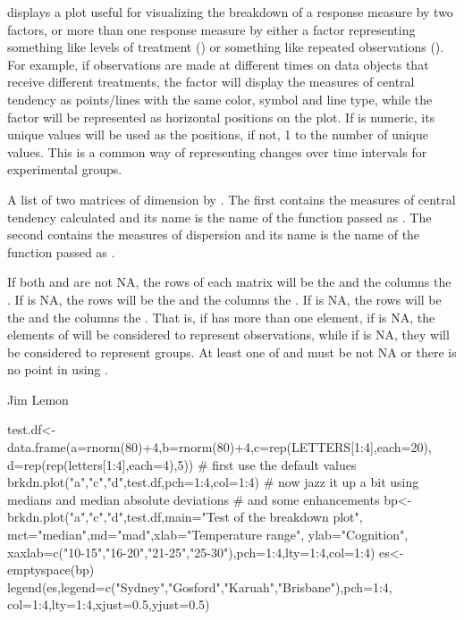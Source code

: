 \begin{Details}\relax
{} displays a plot useful for visualizing the breakdown of a
response measure by two factors, or more than one response measure by either
a factor representing something like levels of treatment () or
something like repeated observations (). For example, if
observations are made at different times on data objects that receive
different treatments, the  factor will display the measures
of central tendency as points/lines with the same color, symbol and line type,
while the  factor will be represented as horizontal positions on the
plot. If  is numeric, its unique values will be used as the 
positions, if not, 1 to the number of unique values. This is a common way of 
representing changes over time intervals for experimental groups.
\end{Details}
\begin{Value}
A list of two matrices of dimension  by 
. The first contains the measures of central
tendency calculated and its name is the name of the function passed as
. The second contains the measures of dispersion and its name
is the name of the function passed as .

If both  and  are not NA, the rows of each matrix
will be the  and the columns the . If 
is NA, the rows will be the  and the columns the .
If  is NA, the rows will be the  and the columns
the . That is, if  has more than one element, if
 is NA, the elements of  will be considered to
represent observations, while if  is NA, they will be
considered to represent groups. At least one of  and 
must be not NA or there is no point in using .
\end{Value}
\begin{Author}\relax
Jim Lemon
\end{Author}
\begin{SeeAlso}\relax
{}
\end{SeeAlso}
\begin{Examples}
\begin{ExampleCode}
 test.df<-data.frame(a=rnorm(80)+4,b=rnorm(80)+4,c=rep(LETTERS[1:4],each=20),
  d=rep(rep(letters[1:4],each=4),5))
 # first use the default values
 brkdn.plot("a","c","d",test.df,pch=1:4,col=1:4)
 # now jazz it up a bit using medians and median absolute deviations
 # and some enhancements
 bp<-brkdn.plot("a","c","d",test.df,main="Test of the breakdown plot",
  mct="median",md="mad",xlab="Temperature range", ylab="Cognition",
  xaxlab=c("10-15","16-20","21-25","25-30"),pch=1:4,lty=1:4,col=1:4)
 es<-emptyspace(bp)
 legend(es,legend=c("Sydney","Gosford","Karuah","Brisbane"),pch=1:4,
  col=1:4,lty=1:4,xjust=0.5,yjust=0.5)
\end{ExampleCode}
\end{Examples}


